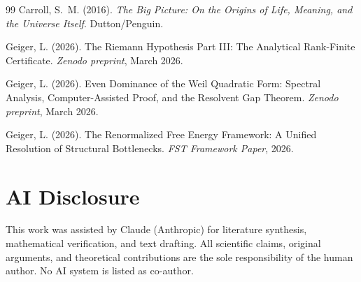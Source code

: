\documentclass[12pt,a4paper]{article}
\theoremstyle{remark}
\begin{document}
\begin{thebibliography}{99}
Carroll, S.~M. (2016).
\newblock \textit{The Big Picture: On the Origins of Life, Meaning, and the Universe Itself}.
\newblock Dutton/Penguin.

Geiger, L. (2026).
\newblock The Riemann Hypothesis Part III: The Analytical Rank-Finite Certificate.
\newblock \textit{Zenodo preprint}, March 2026.

Geiger, L. (2026).
\newblock Even Dominance of the Weil Quadratic Form: Spectral Analysis, Computer-Assisted Proof, and the Resolvent Gap Theorem.
\newblock \textit{Zenodo preprint}, March 2026.

Geiger, L. (2026).
\newblock The Renormalized Free Energy Framework: A Unified Resolution of Structural Bottlenecks.
\newblock \textit{FST Framework Paper}, 2026.

\end{thebibliography}

\section*{AI Disclosure}
This work was assisted by Claude (Anthropic) for literature synthesis, mathematical verification, and text drafting. All scientific claims, original arguments, and theoretical contributions are the sole responsibility of the human author. No AI system is listed as co-author.
\end{document}

